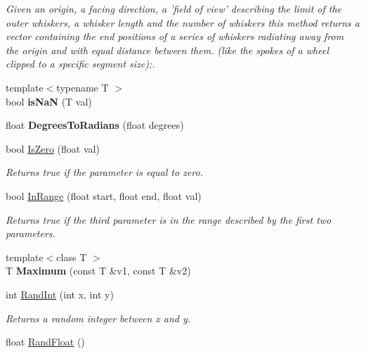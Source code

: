 \begin{DoxyCompactItemize}
\begin{DoxyCompactList}\small\item\em Given an origin, a facing direction, a 'field of view' describing the limit of the outer whiskers, a whisker length and the number of whiskers this method returns a vector containing the end positions of a series of whiskers radiating away from the origin and with equal distance between them. (like the spokes of a wheel clipped to a specific segment size);. \end{DoxyCompactList}\item 
\hypertarget{namespacesteer_ac2a356a56f949c6f8028f41be63b9648}{{\footnotesize template$<$typename T $>$ }\\bool {\bfseries is\-Na\-N} (T val)}\label{namespacesteer_ac2a356a56f949c6f8028f41be63b9648}

\item 
\hypertarget{namespacesteer_a631f62487353e649f14584d5cc37e5b2}{float {\bfseries Degrees\-To\-Radians} (float degrees)}\label{namespacesteer_a631f62487353e649f14584d5cc37e5b2}

\item 
bool \hyperlink{namespacesteer_a299284ee5c45b4163a274a313769b985}{Is\-Zero} (float val)
\begin{DoxyCompactList}\small\item\em Returns true if the parameter is equal to zero. \end{DoxyCompactList}\item 
bool \hyperlink{namespacesteer_af2542d4abfc6cc5317ba4147133ea48d}{In\-Range} (float start, float end, float val)
\begin{DoxyCompactList}\small\item\em Returns true if the third parameter is in the range described by the first two parameters. \end{DoxyCompactList}\item 
\hypertarget{namespacesteer_a3f04d71c01836ce791d0f769c4d95f1d}{{\footnotesize template$<$class T $>$ }\\T {\bfseries Maximum} (const T \&v1, const T \&v2)}\label{namespacesteer_a3f04d71c01836ce791d0f769c4d95f1d}

\item 
int \hyperlink{namespacesteer_a5b36c18ea42e350b735fdc3354185712}{Rand\-Int} (int x, int y)
\begin{DoxyCompactList}\small\item\em Returns a random integer between x and y. \end{DoxyCompactList}\item 
\hypertarget{namespacesteer_a6b962bc6a04b703f282696dcd19804a0}{float \hyperlink{namespacesteer_a6b962bc6a04b703f282696dcd19804a0}{Rand\-Float} ()}\label{namespacesteer_a6b962bc6a04b703f282696dcd19804a0}


\end{DoxyCompactItemize}
